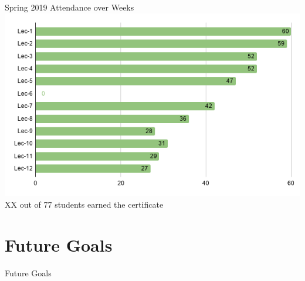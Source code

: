       \begin{frame}{Spring 2019 Attendance over Weeks}
        \centering
        \includegraphics[height=0.75\textheight]{images/attendance.png}
        \LARGE
        \\
        XX out of 77 students earned the certificate
      \end{frame}

    \section{Future Goals}
      \begin{frame}{Future Goals}
      
        
      
      \end{frame}

